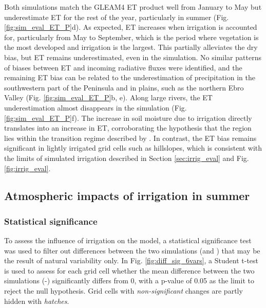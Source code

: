 Both simulations match the GLEAM4 ET product well from January to May but underestimate ET for the rest of the year, particularly in summer (Fig. \ref{fig:sim_eval_ET_P}d). As expected, ET increases when irrigation is accounted for, particularly from May to September, which is the period where vegetation is the most developed and irrigation is the largest. This partially alleviates the dry bias, but ET remains underestimated, even in the \irr simulation.
No similar patterns of biases between ET and incoming radiative fluxes were identified, and the remaining ET bias can be related to the underestimation of precipitation in the southwestern part of the Peninsula and in plains, such as the northern Ebro Valley (Fig. \ref{fig:sim_eval_ET_P}b, e). 
Along large rivers, the ET underestimation almost disappears in the \irr simulation (Fig. \ref{fig:sim_eval_ET_P}f). The increase in soil moisture due to irrigation directly translates into an increase in ET, corroborating the hypothesis that the region lies within the transition regime described by \citet{Budyko_1956}. 
In contrast, the ET bias remains significant in lightly irrigated grid cells such as hillslopes, which is consistent with the limits of simulated irrigation described in Section \ref{sec:irrig_eval} and Fig. \ref{fig:irrig_eval}.

\subsection{Atmospheric impacts of irrigation in summer}
\label{sec:jja_atmospheric_impacts}
\subsubsection{Statistical significance}
To assess the influence of irrigation on the model, a statistical significance test was used to filter out differences between the two simulations (\irr and \noirr) that may be the result of natural variability only. In Fig. \ref{fig:diff_sig_6vars}, a Student t-test is used to assess for each grid cell whether the mean difference between the two simulations  (\irr-\noirr) significantly differs from 0, with a p-value of 0.05 as the limit to reject the null hypothesis. Grid cells with \textit{non-significant} changes are partly hidden with \textit{hatches}.

